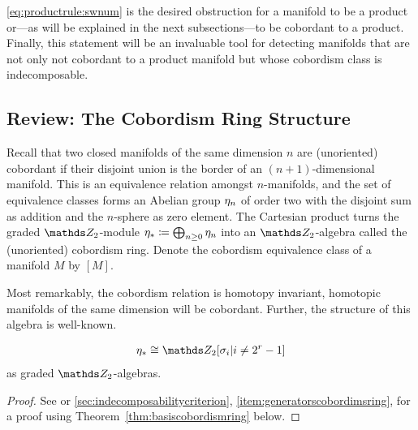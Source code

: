 \autoref{eq:productrule:swnum} is the desired obstruction for
a manifold to be a product or---as will be explained in the next
subsections---to be cobordant to a product.
Finally, this statement will be an invaluable tool for detecting
manifolds that are not only not cobordant to a product manifold but
whose cobordism class is indecomposable.

\subsection{Review: The Cobordism Ring Structure}
\label{sec:cobordismringstructure}
Recall that two closed manifolds of the same dimension $n$ are
(unoriented) cobordant if their disjoint union is the border of an
$(n+1)$-dimensional manifold.
This is an equivalence relation amongst $n$-manifolds, and the
set of equivalence classes forms an Abelian group $\eta_n$ of order two
with the disjoint sum as addition and the $n$-sphere as zero element.
The Cartesian product turns the graded $\Zmod2$-module
$\eta_*\coloneqq \bigoplus_{n\geq 0}\eta_n$ into an $\Zmod2$-algebra
called the (unoriented) cobordism ring.
Denote the cobordism equivalence class of a manifold $M$ by $[M]$.

Most remarkably, the cobordism relation is homotopy invariant, \idest
homotopic manifolds of the same dimension will be cobordant.
Further, the structure of this algebra is well-known.
\begin{Thm}[Thom]\label{thm:cobordismringstructure}
  \begin{gather*}
    \c_*
    \cong \Zmod2[\sigma_i| i\neq 2^r-1]
  \end{gather*}
  as graded $\Zmod2$-algebras.
  \begin{proof}
    See \cite[Theorem~IV.12]{thom} or
    \autoref{sec:indecomposabilitycriterion},
    \ref{item:generatorscobordimsring}, for a proof using
    Theorem~\autoref{thm:basiscobordismring} below.
  \end{proof}
\end{Thm}

